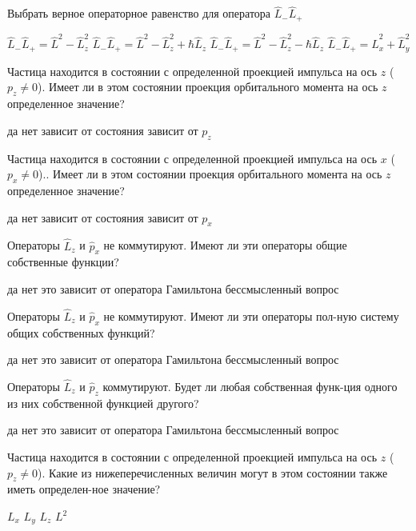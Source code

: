 \documentclass[11pt,a4paper]{exam}
\begin{document}
\begin{questions}
\question Выбрать верное операторное равенство для оператора ${\hat L_ - }{\hat L_ + }$
\begin{choices}
\choice ${\hat L_ - }{\hat L_ + } = {\hat L^2} - \hat L_z^2$  
\choice ${\hat L_ - }{\hat L_ + } = {\hat L^2} - \hat L_z^2 + \hbar {\hat L_z}$ 
\choice ${\hat L_ - }{\hat L_ + } = {\hat L^2} - \hat L_z^2 - \hbar {\hat L_z}$ 
\choice ${\hat L_ - }{\hat L_ + } = \hat L_x^2 + \hat L_y^2$
\end{choices}

\question Частица находится в состоянии с определенной проекцией импульса на ось $z$ (${p_z} \ne 0$). Имеет ли в этом состоянии проекция орбитального момента на ось $z$ определенное значение?
\begin{choices}
\choice да    
\choice нет      
\choice зависит от состояния    
\choice зависит от ${p_z}$
\end{choices}

\question Частица находится в состоянии с определенной проекцией импульса на ось $x$ (${p_x} \ne 0$).. Имеет ли в этом состоянии проекция орбитального момента на ось $z$ определенное значение?
\begin{choices}
\choice да    
\choice нет      
\choice зависит от состояния    
\choice зависит от ${p_x}$
\end{choices}

\question Операторы ${\hat L_z}$ и ${\hat p_x}$ не коммутируют. Имеют ли эти операторы общие собственные функции?
\begin{choices}
\choice да
\choice нет
\choice это зависит от оператора Гамильтона
\choice бессмысленный вопрос
\end{choices}

\question Операторы ${\hat L_z}$ и ${\hat p_x}$ не коммутируют. Имеют ли эти операторы пол-ную систему общих собственных функций?
\begin{choices}
\choice да
\choice нет
\choice это зависит от оператора Гамильтона
\choice бессмысленный вопрос
\end{choices}

\question Операторы ${\hat L_z}$ и ${\hat p_z}$ коммутируют. Будет ли любая собственная функ-ция одного из них собственной функцией другого?
\begin{choices}
\choice да       
\choice нет         
\choice это зависит от оператора Гамильтона
\choice бессмысленный вопрос
\end{choices}

\question Частица находится в состоянии с определенной проекцией импульса на ось $z$ (${p_z} \ne 0$). Какие из нижеперечисленных величин могут в этом состоянии также иметь определен-ное значение?
\begin{choices}
\choice ${L_x}$     
\choice ${L_y}$     
\choice ${L_z}$     
\choice ${L^2}$
\end{choices}


\end{questions}
\end{document}
